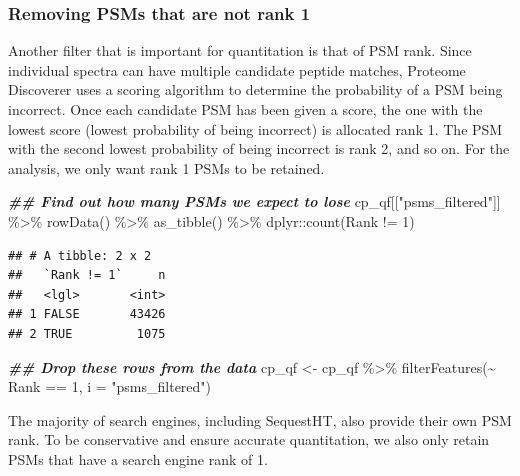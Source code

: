 \documentclass[9pt,a4paper,]{extarticle}
\newenvironment{Shaded}{\begin{snugshade}}{\end{snugshade}}
\newcommand{\AttributeTok}[1]{\textcolor[rgb]{0.77,0.63,0.00}{#1}}
\newcommand{\DecValTok}[1]{\textcolor[rgb]{0.00,0.00,0.81}{#1}}
\newcommand{\DocumentationTok}[1]{\textcolor[rgb]{0.56,0.35,0.01}{\textbf{\textit{#1}}}}
\newcommand{\FunctionTok}[1]{\textcolor[rgb]{0.00,0.00,0.00}{#1}}
\newcommand{\NormalTok}[1]{#1}
\newcommand{\OtherTok}[1]{\textcolor[rgb]{0.56,0.35,0.01}{#1}}
\newcommand{\SpecialCharTok}[1]{\textcolor[rgb]{0.00,0.00,0.00}{#1}}
\newcommand{\StringTok}[1]{\textcolor[rgb]{0.31,0.60,0.02}{#1}}
\begin{document}
\hypertarget{removing-psms-that-are-not-rank-1}{%
\subsubsection{Removing PSMs that are not rank 1}\label{removing-psms-that-are-not-rank-1}}

Another filter that is important for quantitation is that of PSM rank. Since
individual spectra can have multiple candidate peptide matches, Proteome
Discoverer uses a scoring algorithm to determine the probability of a PSM being
incorrect. Once each candidate PSM has been given a score, the one with the
lowest score (lowest probability of being incorrect) is allocated rank 1. The PSM
with the second lowest probability of being incorrect is rank 2, and so on. For
the analysis, we only want rank 1 PSMs to be retained.

\begin{Shaded}
\begin{Highlighting}[]
\DocumentationTok{\#\# Find out how many PSMs we expect to lose}
\NormalTok{cp\_qf[[}\StringTok{"psms\_filtered"}\NormalTok{]] }\SpecialCharTok{\%\textgreater{}\%} 
  \FunctionTok{rowData}\NormalTok{() }\SpecialCharTok{\%\textgreater{}\%} 
  \FunctionTok{as\_tibble}\NormalTok{() }\SpecialCharTok{\%\textgreater{}\%} 
\NormalTok{  dplyr}\SpecialCharTok{::}\FunctionTok{count}\NormalTok{(Rank }\SpecialCharTok{!=} \DecValTok{1}\NormalTok{)}
\end{Highlighting}
\end{Shaded}

\begin{verbatim}
## # A tibble: 2 x 2
##   `Rank != 1`     n
##   <lgl>       <int>
## 1 FALSE       43426
## 2 TRUE         1075
\end{verbatim}

\begin{Shaded}
\begin{Highlighting}[]
\DocumentationTok{\#\# Drop these rows from the data}
\NormalTok{cp\_qf }\OtherTok{\textless{}{-}}\NormalTok{ cp\_qf }\SpecialCharTok{\%\textgreater{}\%}
  \FunctionTok{filterFeatures}\NormalTok{(}\SpecialCharTok{\textasciitilde{}}\NormalTok{ Rank }\SpecialCharTok{==} \DecValTok{1}\NormalTok{,}
                 \AttributeTok{i =} \StringTok{"psms\_filtered"}\NormalTok{)}
\end{Highlighting}
\end{Shaded}

The majority of search engines, including SequestHT, also provide their own PSM
rank. To be conservative and ensure accurate quantitation, we also only retain
PSMs that have a search engine rank of 1.
\end{document}
